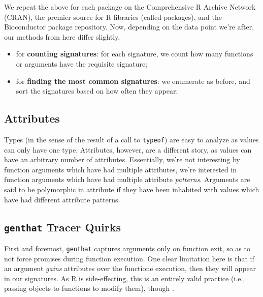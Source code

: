 \documentclass[acmsmall,10pt,review,anonymous]{acmart}\settopmatter{printfolios=true,printccs=false,printacmref=false}
\begin{document}
We repeat the above for each package on the Comprehensive R Archive Network
(CRAN), the premier source for R libraries (called packages), and the
Bioconductor package repository.  Now, depending on the data point we're
after, our methods from here differ slightly.

\begin{itemize}
    \item for \textbf{counting signatures}: for each signature, we count how
      many functions or arguments have the requisite signature;
    \item for \textbf{finding the most common signatures}: we enumerate as
      before, and sort the signatures based on how often they appear;
\end{itemize}

%
%
\subsection{Attributes}\label{sec:method:attributes}

Types (in the sense of the result of a call to {\tt typeof}) are easy to
analyze as values can only have one type.  Attributes, however, are a
different story, as values can have an arbitrary number of attributes.
Essentially, we're not interesting by function arguments which have had
multiple attributes, we're interested in function arguments which have had
multiple attribute \textit{patterns}. 
Arguments are said to be polymorphic in attribute if they have been
inhabited with values which have had different attribute patterns.  




%
%
%
%
\subsection{{\tt genthat} Tracer Quirks}

First and foremost, {\tt genthat} captures arguments only on function exit,
so as to not force promises during function execution.   One
clear limitation here is that if an argument \textit{gains} attributes over
the functione execution, then they will appear in our signatures.  As R is
side-effecting, this is an entirely valid practice (i.e., passing objects to
functions to modify them), though .
\end{document}
